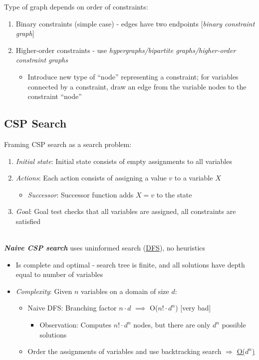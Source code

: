 \documentclass[12pt]{extarticle}
\theoremstyle{definition}
\theoremstyle{remark}
\newcommand{\pstart}[0]{\noindent}
\newcommand{\newp}[0]{~\\ \pstart}
\newcommand{\term}[1]{\noindent\textbf{\textit{#1}}}
\begin{document}
\vspace{8pt}\pstart
Type of graph depends on order of constraints: \begin{enumerate}
    \item Binary constraints (simple case) - edges have two endpoints [\textit{binary constraint graph}]
    \item Higher-order constraints - use \textit{hypergraphs/bipartite graphs/higher-order constraint graphs} \begin{itemize}
        \item Introduce new type of ``node'' representing a constraint; for variables connected by a constraint, draw an edge from the variable nodes to the constraint ``node''
    \end{itemize}
\end{enumerate}

\subsection{CSP Search}
Framing CSP search as a search problem: \begin{enumerate}
    \item \textit{Initial state}: Initial state consists of empty assignments to all variables
    \item \textit{Actions}: Each action consists of assigning a value $v$ to a variable $X$ \begin{itemize}
        \item \textit{Successor}: Successor function adds $X=v$ to the state
    \end{itemize}
    \item \textit{Goal}: Goal test checks that all variables are assigned, all constraints are satisfied
\end{enumerate}

\newp
\term{Naive CSP search} uses uninformed search (\ul{DFS}), no heuristics \begin{itemize}
    \item Is complete and optimal - search tree is finite, and all solutions have depth equal to number of variables
    \item \textit{Complexity}: Given $n$ variables on a domain of size $d$: \begin{itemize}
        \item Naive DFS: Branching factor $n\cdot d$ $\implies$ O($n!\cdot d^n$) [very bad] \begin{itemize}
            \item Observation: Computes $n!\cdot d^n$ nodes, but there are only $d^n$ possible solutions
        \end{itemize}
        \item Order the assignments of variables and use backtracking search $\Rightarrow$ \ul{O($d^n$)}
    \end{itemize}
\end{itemize}
\end{document}
